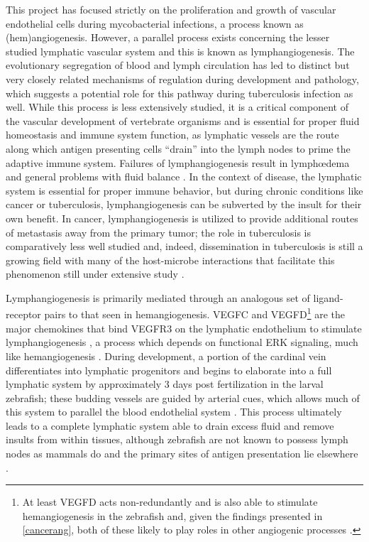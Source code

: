 This project has focused strictly on the proliferation and growth of vascular endothelial cells during mycobacterial infections, a process known as (hem)angiogenesis. However, a parallel process exists concerning the lesser studied lymphatic vascular system and this is known as lymphangiogenesis. The evolutionary segregation of blood and lymph circulation has led to distinct but very closely related mechanisms of regulation during development and pathology, which suggests a potential role for this pathway during tuberculosis infection as well. While this process is less extensively studied, it is a critical component of the vascular development of vertebrate organisms and is essential for proper fluid homeostasis and immune system function, as lymphatic vessels are the route along which antigen presenting cells ``drain'' into the lymph nodes to prime the adaptive immune system. Failures of lymphangiogenesis result in lymph\oe dema and general problems with fluid balance \citep{Makinen2001}. In the context of disease, the lymphatic system is essential for proper immune behavior, but during chronic conditions like cancer or tuberculosis, lymphangiogenesis can be subverted by the insult for their own benefit. In cancer, lymphangiogenesis is utilized to provide additional routes of metastasis away from the primary tumor; the role in tuberculosis is comparatively less well studied \citep{Huang2010, Augustin2009, Duong2012, Stacker2014} and, indeed, dissemination in tuberculosis is still a growing field with many of the host\hyp{}microbe interactions that facilitate this phenomenon still under extensive study \citep{Saelens2022}.

Lymphangiogenesis is primarily mediated through an analogous set of ligand\hyp{}receptor pairs to that seen in hemangiogenesis. VEGFC and VEGFD\footnote{At least VEGFD acts non\hyp{}redundantly and is also able to stimulate hemangiogenesis in the zebrafish and, given the findings presented in \autoref{cancerang}, both of these likely to play roles in other angiogenic processes \citep{Bower2017a}.} are the major  chemokines that bind VEGFR3 on the lymphatic endothelium to stimulate lymphangiogenesis \citep{Alitalo2005, Kuchler2006, Haiko2008}, a process which depends on functional ERK signaling, much like hemangiogenesis \citep{Shin2017, Shin2016}. During development, a portion of the cardinal vein differentiates into lymphatic progenitors \citep{Yaniv2006, Nicenboim2015} and begins to elaborate into a full lymphatic system by approximately 3 days post fertilization in the larval zebrafish; these budding vessels are guided by arterial cues, which allows much of this system to parallel the blood endothelial system \citep{Jung2017, Bussmann2010}. This process ultimately leads to a complete lymphatic system able to drain excess fluid and remove insults from within tissues, although zebrafish are not known to possess lymph nodes as mammals do and the primary sites of antigen presentation lie elsewhere \citep{vanLessen2017, Onder2017, Korbut2016}.

